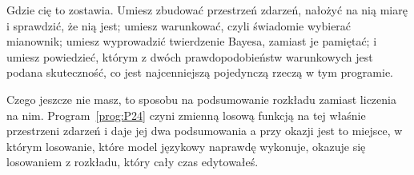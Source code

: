 \begin{fr}
Gdzie cię to zostawia. Umiesz zbudować przestrzeń zdarzeń, nałożyć na nią
miarę i sprawdzić, że nią jest; umiesz warunkować, czyli świadomie wybierać
mianownik; umiesz wyprowadzić twierdzenie Bayesa, zamiast je pamiętać; i
umiesz powiedzieć, którym z dwóch prawdopodobieństw warunkowych jest podana
skuteczność, co jest najcenniejszą pojedynczą rzeczą w tym programie.

Czego jeszcze nie masz, to sposobu na podsumowanie rozkładu zamiast liczenia
na nim. Program~\ref{prog:P24} czyni zmienną losową funkcją na tej właśnie
przestrzeni zdarzeń i daje jej dwa podsumowania \dash{} a przy okazji jest to
miejsce, w którym losowanie, które model językowy naprawdę wykonuje, okazuje
się losowaniem z rozkładu, który cały czas edytowałeś.
\end{fr}

